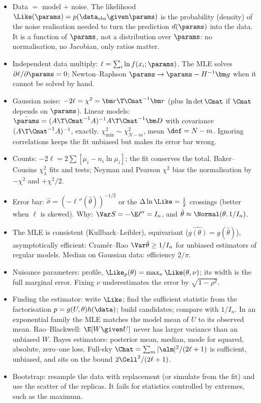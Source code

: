 \begin{recap}
\begin{itemize}
  \item Data $=$ model $+$ noise. The likelihood
        $\Like(\params)=p(\data_{\text{obs}}\given\params)$ is the probability
        (density) of the noise realisation needed to turn the prediction
        $d(\params)$ into the data. It is a function of $\params$, not a
        distribution over $\params$: no normalisation, no Jacobian, only
        ratios matter.
  \item Independent data multiply: $\ell=\sum_i\ln f(x_i;\params)$. The MLE
        solves $\partial\ell/\partial\params=0$; Newton--Raphson
        $\params\to\params-H^{-1}\bm g$ when it cannot be solved by hand.
  \item Gaussian noise: $-2\ell=\chi^2=\bm r\T\Cmat^{-1}\bm r$ (plus
        $\ln\det\Cmat$ if $\Cmat$ depends on $\params$). Linear models:
        $\hat\params=(A\T\Cmat^{-1}A)^{-1}A\T\Cmat^{-1}\bm D$ with covariance
        $(A\T\Cmat^{-1}A)^{-1}$, exactly. $\chi^2_{\min}\sim\chi^2_{N-m}$,
        mean $\dof=N-m$. Ignoring correlations keeps the fit unbiased but
        makes its error bar wrong.
  \item Counts: $-2\ell=2\sum[\mu_i-n_i\ln\mu_i]$; the fit conserves the
        total. Baker--Cousins $\chi^2_\lambda$ fits and tests; Neyman and
        Pearson $\chi^2$ bias the normalisation by $-\chi^2$ and
        $+\chi^2/2$.
  \item Error bar: $\hat\sigma=(-\ell''(\hat\theta))^{-1/2}$ or the
        $\Delta\ln\Like=\tfrac12$ crossings (better when $\ell$ is skewed).
        Why: $\Var S=-\E\ell''=I_n$, and $\hat\theta\approx\Normal(\theta,1/I_n)$.
  \item The MLE is consistent (Kullback--Leibler), equivariant
        ($\widehat{g(\theta)}=g(\hat\theta)$), asymptotically efficient:
        Cram\'er--Rao $\Var\hat\theta\ge1/I_n$ for unbiased estimators of
        regular models. Median on Gaussian data: efficiency $2/\pi$.
  \item Nuisance parameters: profile,
        $\Like_p(\theta)=\max_\nu\Like(\theta,\nu)$; its width is the full
        marginal error. Fixing $\nu$ underestimates the error by
        $\sqrt{1-\rho^2}$.
  \item Finding the estimator: write $\Like$; find the sufficient statistic
        from the factorisation $p=g(U,\theta)h(\data)$; build candidates;
        compare with $1/I_n$. In an exponential family the MLE matches the
        model mean of $U$ to its observed mean. Rao--Blackwell:
        $\E[W\given U]$ never has larger variance than an unbiased $W$.
        Bayes estimators: posterior mean, median, mode for squared,
        absolute, zero--one loss. Full-sky $\Chat=\sum_m|\alm|^2/(2\ell+1)$
        is sufficient, unbiased, and sits on the bound $2\Cell^2/(2\ell+1)$.
  \item Bootstrap: resample the data with replacement (or simulate from the
        fit) and use the scatter of the replicas. It fails for statistics
        controlled by extremes, such as the maximum.
\end{itemize}
\end{recap}

